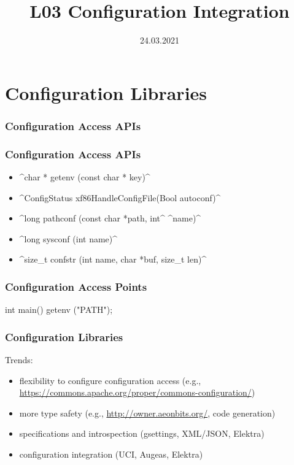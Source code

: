 

\title{L03 Configuration Integration}
\date{24.03.2021}



\section{Configuration Libraries}

\begin{frame}
	\frametitle{Configuration Access APIs}

	\Large

\end{frame}

\begin{frame}[fragile]
	\frametitle{Configuration Access APIs}

	\begin{itemize}[<+-| alert@+>]
	\item ^char * getenv (const char * key)^
	\item ^ConfigStatus xf86HandleConfigFile(Bool autoconf)^
	\item ^long pathconf (const char *path, int^ ^name)^
	\item ^long sysconf (int name)^
	\item ^size_t confstr (int name, char *buf, size_t len)^
	\end{itemize}
\end{frame}

\begin{frame}[fragile]
	\frametitle{Configuration Access Points}

	\begin{code}[language=Cpp,gobble=4,showspaces=no]
	int main()
	{
		getenv ("PATH");
	}
	\end{code}
\end{frame}

\begin{frame}[fragile]
	\frametitle{Configuration Libraries}

	Trends:
	\begin{itemize}[<+-| alert@+>]
	\item flexibility to configure configuration access (e.g., \url{https://commons.apache.org/proper/commons-configuration/})
	\item more type safety (e.g., \url{http://owner.aeonbits.org/}, code generation)
	\item specifications and introspection (gsettings, XML/JSON, Elektra)
	\item configuration integration (UCI, Augeas, Elektra)
	\end{itemize}
\end{frame}

